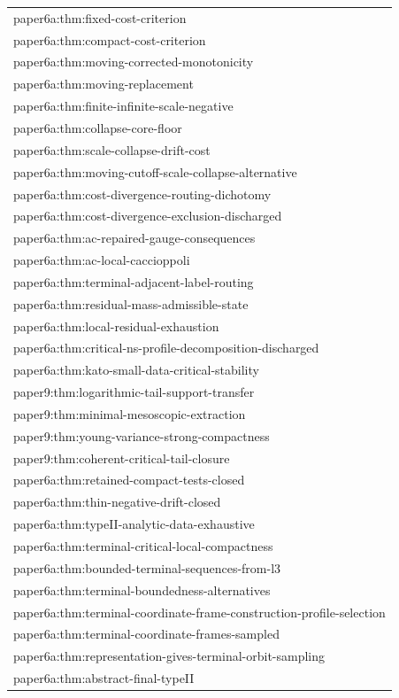 \documentclass[11pt]{amsart}
\begin{document}
\begin{longtable}{@{}>{\ttfamily\footnotesize\raggedright\arraybackslash}p{}@{}}
paper6a:thm:fixed-cost-criterion\\
paper6a:thm:compact-cost-criterion\\
paper6a:thm:moving-corrected-monotonicity\\
paper6a:thm:moving-replacement\\
paper6a:thm:finite-infinite-scale-negative\\
paper6a:thm:collapse-core-floor\\
paper6a:thm:scale-collapse-drift-cost\\
paper6a:thm:moving-cutoff-scale-collapse-alternative\\
paper6a:thm:cost-divergence-routing-dichotomy\\
paper6a:thm:cost-divergence-exclusion-discharged\\
paper6a:thm:ac-repaired-gauge-consequences\\
paper6a:thm:ac-local-caccioppoli\\
paper6a:thm:terminal-adjacent-label-routing\\
paper6a:thm:residual-mass-admissible-state\\
paper6a:thm:local-residual-exhaustion\\
paper6a:thm:critical-ns-profile-decomposition-discharged\\
paper6a:thm:kato-small-data-critical-stability\\
paper9:thm:logarithmic-tail-support-transfer\\
paper9:thm:minimal-mesoscopic-extraction\\
paper9:thm:young-variance-strong-compactness\\
paper9:thm:coherent-critical-tail-closure\\
paper6a:thm:retained-compact-tests-closed\\
paper6a:thm:thin-negative-drift-closed\\
paper6a:thm:typeII-analytic-data-exhaustive\\
paper6a:thm:terminal-critical-local-compactness\\
paper6a:thm:bounded-terminal-sequences-from-l3\\
paper6a:thm:terminal-boundedness-alternatives\\
paper6a:thm:terminal-coordinate-frame-construction-profile-selection\\
paper6a:thm:terminal-coordinate-frames-sampled\\
paper6a:thm:representation-gives-terminal-orbit-sampling\\
paper6a:thm:abstract-final-typeII\\

\end{longtable}
\end{document}
